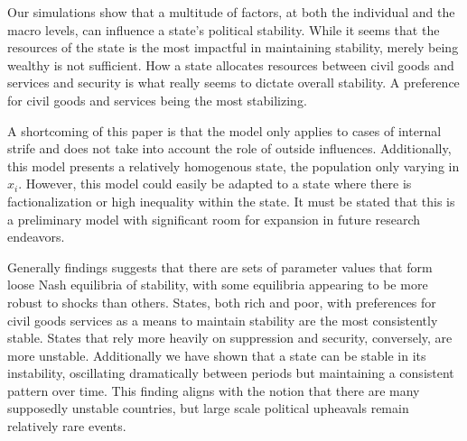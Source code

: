 \documentclass[12pt]{article}
\begin{document}
\begin{spacing}{1.5}
Our simulations show that a multitude of factors, at both the individual and the macro levels, can influence a state’s political stability. While it seems that the resources of the state is the most impactful in maintaining stability, merely being wealthy is not sufficient. How a state allocates resources between civil goods and services and security is what really seems to dictate overall stability. A preference for civil goods and services being the most stabilizing. 
 
 
A shortcoming of this paper is that the model only applies to cases of internal strife and does not take into account the role of outside influences. Additionally, this model presents a relatively homogenous state, the population only varying in $x_i$. However, this model could easily be adapted to a state where there is factionalization or high inequality within the state. It must be stated that this is a preliminary model with significant room for expansion in future research endeavors. 
 
Generally findings suggests that there are sets of parameter values that form loose Nash equilibria of stability, with some equilibria appearing to be more robust to shocks than others. States, both rich and poor, with preferences for civil goods services as a means to maintain stability are the most consistently stable. States that rely more heavily on suppression and security, conversely, are more unstable. Additionally we have shown that a state can be stable in its instability, oscillating dramatically between periods but maintaining a consistent pattern over time. This finding aligns with the notion that there are many supposedly unstable countries, but large scale political upheavals remain relatively rare events. 
 

 

\end{spacing}


\pagebreak




\nocite{*}
\end{document}

